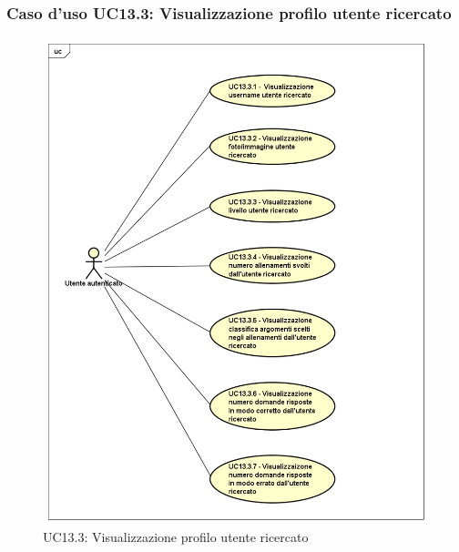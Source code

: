 \subsubsection{Caso d'uso UC13.3: Visualizzazione profilo utente ricercato}
\label{UC13.3}
\begin{figure}[h]
	\centering
	\includegraphics[scale=0.5]{UML/UC13_3.png}
	\caption{UC13.3: Visualizzazione profilo utente ricercato}
\end{figure}
\FloatBarrier
